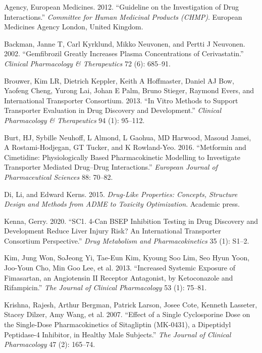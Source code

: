 \documentclass[
  11pt,
  krantz2, a4paper, twoside]{krantz}
\newlength{\cslhangindent}
\newlength{\cslentryspacingunit} %
\newenvironment{CSLReferences}[2] %
 {%
  \setlength{\parindent}{0pt}
  \ifodd #1
  \let\oldpar\par
  \def\par{\hangindent=\cslhangindent\oldpar}
  \fi
  \setlength{\parskip}{#2\cslentryspacingunit}
 }%
 {}
\begin{document}
\hypertarget{refs}{}
\begin{CSLReferences}{1}{0}
\leavevmode{}%
Agency, European Medicines. 2012. {``Guideline on the Investigation of Drug Interactions.''} \emph{Committee for Human Medicinal Products (CHMP)}. European Medicines Agency London, United Kingdom.

\leavevmode{}%
Backman, Janne T, Carl Kyrklund, Mikko Neuvonen, and Pertti J Neuvonen. 2002. {``Gemfibrozil Greatly Increases Plasma Concentrations of Cerivastatin.''} \emph{Clinical Pharmacology \& Therapeutics} 72 (6): 685--91.

\leavevmode{}%
Brouwer, Kim LR, Dietrich Keppler, Keith A Hoffmaster, Daniel AJ Bow, Yaofeng Cheng, Yurong Lai, Johan E Palm, Bruno Stieger, Raymond Evers, and International Transporter Consortium. 2013. {``In Vitro Methods to Support Transporter Evaluation in Drug Discovery and Development.''} \emph{Clinical Pharmacology \& Therapeutics} 94 (1): 95--112.

\leavevmode{}%
Burt, HJ, Sybille Neuhoff, L Almond, L Gaohua, MD Harwood, Masoud Jamei, A Rostami-Hodjegan, GT Tucker, and K Rowland-Yeo. 2016. {``Metformin and Cimetidine: Physiologically Based Pharmacokinetic Modelling to Investigate Transporter Mediated Drug--Drug Interactions.''} \emph{European Journal of Pharmaceutical Sciences} 88: 70--82.

\leavevmode{}%
Di, Li, and Edward Kerns. 2015. \emph{Drug-Like Properties: Concepts, Structure Design and Methods from ADME to Toxicity Optimization}. Academic press.

\leavevmode{}%
Kenna, Gerry. 2020. {``SC1. 4-Can BSEP Inhibition Testing in Drug Discovery and Development Reduce Liver Injury Risk? An International Transporter Consortium Perspective.''} \emph{Drug Metabolism and Pharmacokinetics} 35 (1): S1--2.

\leavevmode{}%
Kim, Jung Won, SoJeong Yi, Tae-Eun Kim, Kyoung Soo Lim, Seo Hyun Yoon, Joo-Youn Cho, Min Goo Lee, et al. 2013. {``Increased Systemic Exposure of Fimasartan, an Angiotensin II Receptor Antagonist, by Ketoconazole and Rifampicin.''} \emph{The Journal of Clinical Pharmacology} 53 (1): 75--81.

\leavevmode{}%
Krishna, Rajesh, Arthur Bergman, Patrick Larson, Josee Cote, Kenneth Lasseter, Stacey Dilzer, Amy Wang, et al. 2007. {``Effect of a Single Cyclosporine Dose on the Single-Dose Pharmacokinetics of Sitagliptin (MK-0431), a Dipeptidyl Peptidase-4 Inhibitor, in Healthy Male Subjects.''} \emph{The Journal of Clinical Pharmacology} 47 (2): 165--74.


\end{CSLReferences}
\end{document}
